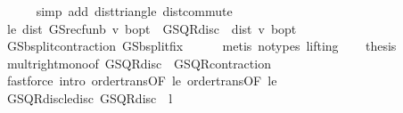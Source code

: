 \begin{isabellebody}
\ \ \ \ \isamarkupfalse%
\ {\isacharparenleft}{\kern0pt}simp\ add{\isacharcolon}{\kern0pt}\ dist{\isacharunderscore}{\kern0pt}triangle\ dist{\isacharunderscore}{\kern0pt}commute{\isacharparenright}{\kern0pt}\isanewline
\ \ \isamarkupfalse%
\ le{}{\isacharcolon}{\kern0pt}\ {\isachardoublequoteopen}dist\ {\isacharparenleft}{\kern0pt}GS{\isacharunderscore}{\kern0pt}rec{\isacharunderscore}{\kern0pt}fun\isactrlsub b\ v{\isacharparenright}{\kern0pt}\ {\isasymnu}\isactrlsub b{\isacharunderscore}{\kern0pt}opt\ {\isasymle}\ GS{\isachardot}{\kern0pt}QR{\isacharunderscore}{\kern0pt}disc\ {\isacharasterisk}{\kern0pt}\ dist\ v\ {\isasymnu}\isactrlsub b{\isacharunderscore}{\kern0pt}opt{\isachardoublequoteclose}\isanewline
\ \ \ \ \isamarkupfalse%
\ GS{\isachardot}{\kern0pt}{\isasymL}\isactrlsub b{\isacharunderscore}{\kern0pt}split{\isacharunderscore}{\kern0pt}contraction\ GS{\isachardot}{\kern0pt}{\isasymL}\isactrlsub b{\isacharunderscore}{\kern0pt}split{\isacharunderscore}{\kern0pt}fix\isanewline
\ \ \ \ \isamarkupfalse%
\ {\isacharparenleft}{\kern0pt}metis\ {\isacharparenleft}{\kern0pt}no{\isacharunderscore}{\kern0pt}types{\isacharcomma}{\kern0pt}\ lifting{\isacharparenright}{\kern0pt}{\isacharparenright}{\kern0pt}\isanewline
\ \ \isamarkupfalse%
\ {\isacharquery}{\kern0pt}thesis\isanewline
\ \ \ \ \isamarkupfalse%
\ mult{\isacharunderscore}{\kern0pt}right{\isacharunderscore}{\kern0pt}mono{\isacharbrackleft}{\kern0pt}of\ GS{\isachardot}{\kern0pt}QR{\isacharunderscore}{\kern0pt}disc\ {}{\isacharbrackright}{\kern0pt}\ GS{\isachardot}{\kern0pt}QR{\isacharunderscore}{\kern0pt}contraction\isanewline
\ \ \ \ \isamarkupfalse%
\ {\isacharparenleft}{\kern0pt}fastforce\ intro{\isacharbang}{\kern0pt}{\isacharcolon}{\kern0pt}\ order{\isachardot}{\kern0pt}trans{\isacharbrackleft}{\kern0pt}OF\ le{}{\isacharbrackright}{\kern0pt}\ order{\isachardot}{\kern0pt}trans{\isacharbrackleft}{\kern0pt}OF\ le{}{\isacharbrackright}{\kern0pt}{\isacharparenright}{\kern0pt}\isanewline
{}\isamarkupfalse%
%
\endisatagproof
{\isafoldproof}%
%
\isadelimproof
\isanewline
%
\endisadelimproof
\isanewline
{}\isamarkupfalse%
\ GS{\isacharunderscore}{\kern0pt}QR{\isacharunderscore}{\kern0pt}disc{\isacharunderscore}{\kern0pt}le{\isacharunderscore}{\kern0pt}disc{\isacharcolon}{\kern0pt}\ {\isachardoublequoteopen}GS{\isachardot}{\kern0pt}QR{\isacharunderscore}{\kern0pt}disc\ {\isasymle}\ l{\isachardoublequoteclose}\isanewline

\end{isabellebody}
